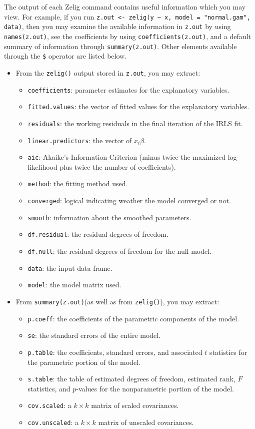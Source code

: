 The output of each Zelig command contains useful information which you may view. For example, if you run {\tt z.out <- zelig(y \~{} x, model = "normal.gam", data)}, then you may examine the available information in {\tt z.out} by using {\tt names(z.out)}, see the coefficients by using {\tt coefficients(z.out)}, and a default summary of information through {\tt summary(z.out)}. Other elements available through the {\tt \$} operator are listed below. 
\begin{itemize}
\item From the {\tt zelig()} output stored in {\tt  z.out}, you may extract:
\begin{itemize}
\item {\tt coefficients}: parameter estimates for the explanatory variables.
\item {\tt fitted.values}: the vector of fitted values for the explanatory variables.
\item {\tt residuals}: the working residuals in the final iteration of the IRLS fit. 
\item {\tt linear.predictors}: the vector of $x_{i}\beta$.
\item {\tt aic}: Akaike's Information Criterion (minus twice the maximized log-likelihood plus twice the number of coefficients).
\item {\tt method}: the fitting method used.
\item {\tt converged}: logical indicating weather the model converged or not.
\item {\tt smooth}: information about the smoothed parameters.
\item {\tt df.residual}: the residual degrees of freedom.
\item {\tt df.null}: the residual degrees of freedom for the null model. 
\item {\tt data}: the input data frame. 
\item {\tt model}: the model matrix used.


\end{itemize}
\item From {\tt summary(z.out)}(as well as from {\tt zelig()}), you may extract:
\begin{itemize}
\item {\tt p.coeff}: the coefficients of the parametric components of the model. 
\item {\tt se}: the standard errors of the entire model. 
\item {\tt p.table}: the coefficients, standard errors, and associated $t$ statistics for the parametric portion of the model. 
\item {\tt s.table}: the table of estimated degrees of freedom, estimated rank, $F$ statistics, and $p$-values for the nonparametric portion of the model. 
\item {\tt cov.scaled}: a $k \times k$ matrix of scaled covariances.
\item {\tt cov.unscaled}: a $k \times k$ matrix of unscaled covariances. 
\end{itemize}



\end{itemize}
